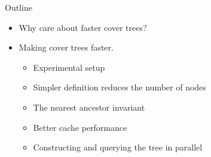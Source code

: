 \documentclass{beamer}
\theoremstyle{nameddefinition}
\newcommand\+{\op}
\begin{document}
%
%
%





\begin{frame}[fragile]{Outline}
\LARGE
\centering
\begin{itemize}
\item
Why care about faster cover trees?
\vspace{0.2in}
\item
Making cover trees faster.
\begin{itemize}
\Large
\vspace{0.1in}
\item Experimental setup
\vspace{0.1in}
\item Simpler definition reduces the number of nodes
\vspace{0.1in}
\item The nearest ancestor invariant
\vspace{0.1in}
\item Better cache performance
\vspace{0.1in}
\item Constructing and querying the tree in parallel
\end{itemize}
\end{itemize}
\end{frame}
\end{document}
